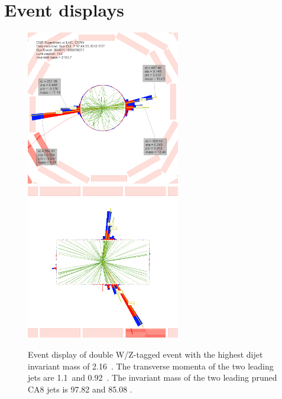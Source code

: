 
\section{Event displays}


\begin{figure}[htb]
\begin{center}
\includegraphics[width=0.6\textwidth,angle=0]{EXO-14-009/figs/event-display/highdoublemass/rho-phi-white.png}
\includegraphics[width=0.6\textwidth,angle=0]{EXO-14-009/figs/event-display/highdoublemass/rho-z-white.png}
\end{center}
\caption{Event display of double W/Z-tagged event with the highest dijet invariant mass of 2.16~\TeVcc .
The transverse momenta of the two leading jets are 1.1~\TeVcc and 0.92~\TeVcc .
The invariant mass of the two leading pruned CA8 jets is 97.82 \GeVcc and 85.08 \GeVcc .
}
\label{fig:eventdisplay1}
\end{figure}

